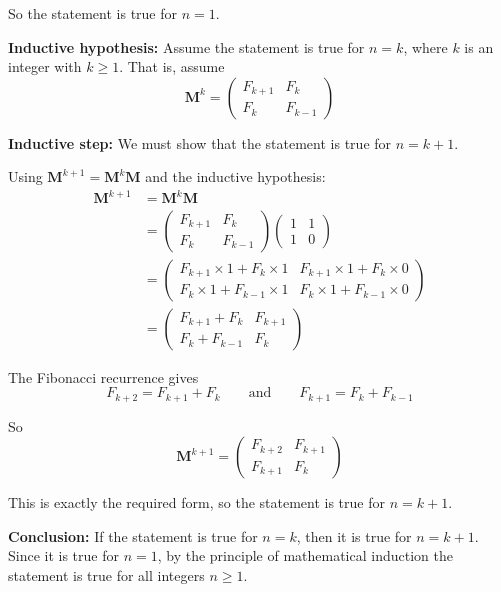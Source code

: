 \documentclass[leqno]{article}
\begin{document}
\begin{enumerate}[
  label=\textbf{\arabic*.},
  leftmargin=*,
  topsep=0pt,
  partopsep=0pt,
  parsep=0pt
]
\begin{djsSolution}
So the statement is true for \(n=1\).

\textbf{Inductive hypothesis:} Assume the statement is true for \(n=k\), where \(k\) is an integer with \(k\geq 1\). That is, assume
\[
\mathbf{M}^k=\begin{pmatrix}F_{k+1}&F_k\\F_k&F_{k-1}\end{pmatrix}
\]

\textbf{Inductive step:} We must show that the statement is true for \(n=k+1\).

Using \(\mathbf{M}^{k+1}=\mathbf{M}^k\mathbf{M}\) and the inductive hypothesis:
\begin{align*}
\mathbf{M}^{k+1}
&=\mathbf{M}^k\mathbf{M}\\
&=\begin{pmatrix}F_{k+1}&F_k\\F_k&F_{k-1}\end{pmatrix}
\begin{pmatrix}1&1\\1&0\end{pmatrix}\\
&=\begin{pmatrix}
F_{k+1}\times 1+F_k\times 1 & F_{k+1}\times 1+F_k\times 0\\
F_k\times 1+F_{k-1}\times 1 & F_k\times 1+F_{k-1}\times 0
\end{pmatrix}\\
&=\begin{pmatrix}
F_{k+1}+F_k & F_{k+1}\\
F_k+F_{k-1} & F_k
\end{pmatrix}
\end{align*}

The Fibonacci recurrence gives
\[
F_{k+2}=F_{k+1}+F_k
\qquad\text{and}\qquad
F_{k+1}=F_k+F_{k-1}
\]

So
\[
\mathbf{M}^{k+1}
=\begin{pmatrix}
F_{k+2}&F_{k+1}\\
F_{k+1}&F_k
\end{pmatrix}
\]

This is exactly the required form, so the statement is true for \(n=k+1\).

\textbf{Conclusion:} If the statement is true for \(n=k\), then it is true for \(n=k+1\). Since it is true for \(n=1\), by the principle of mathematical induction the statement is true for all integers \(n\geq 1\).
\end{djsSolution}


\newpage


\end{enumerate}
\end{document}
